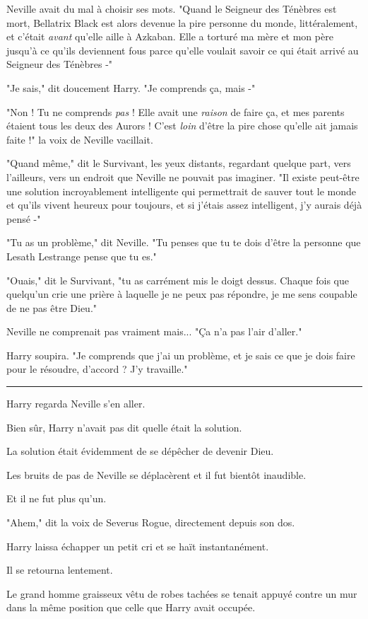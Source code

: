 Neville avait du mal à choisir ses mots. "Quand le Seigneur des Ténèbres est mort, Bellatrix Black est alors devenue la pire personne du monde, littéralement, et c'était \emph{avant}  qu'elle aille à Azkaban. Elle a torturé ma mère et mon père jusqu'à ce qu'ils deviennent fous parce qu'elle voulait savoir ce qui était arrivé au Seigneur des Ténèbres -"

"Je sais," dit doucement Harry. "Je comprends ça, mais -"

"Non ! Tu ne comprends \emph{pas}  ! Elle avait une \emph{raison}  de faire ça, et mes parents étaient tous les deux des Aurors ! C'est \emph{loin}  d'être la pire chose qu'elle ait jamais faite !" la voix de Neville vacillait.

"Quand même," dit le Survivant, les yeux distants, regardant quelque part, vers l'ailleurs, vers un endroit que Neville ne pouvait pas imaginer. "Il existe peut-être une solution incroyablement intelligente qui permettrait de sauver tout le monde et qu'ils vivent heureux pour toujours, et si j'étais assez intelligent, j'y aurais déjà pensé -"

"Tu as un problème," dit Neville. "Tu penses que tu te dois d'être la personne que Lesath Lestrange pense que tu es."

"Ouais," dit le Survivant, "tu as carrément mis le doigt dessus. Chaque fois que quelqu'un crie une prière à laquelle je ne peux pas répondre, je me sens coupable de ne pas être Dieu."

Neville ne comprenait pas vraiment mais... "Ça n'a pas l'air d'aller."

Harry soupira. "Je comprends que j'ai un problème, et je sais ce que je dois faire pour le résoudre, d'accord ? J'y travaille."
\par\noindent\rule{\textwidth}{0.4pt}
Harry regarda Neville s'en aller.

Bien sûr, Harry n'avait pas dit quelle était la solution.

La solution était évidemment de se dépêcher de devenir Dieu.

Les bruits de pas de Neville se déplacèrent et il fut bientôt inaudible.

Et il ne fut plus qu'un.

"Ahem," dit la voix de Severus Rogue, directement depuis son dos.

Harry laissa échapper un petit cri et se haït instantanément.

Il se retourna lentement.

Le grand homme graisseux vêtu de robes tachées se tenait appuyé contre un mur dans la même position que celle que Harry avait occupée.


